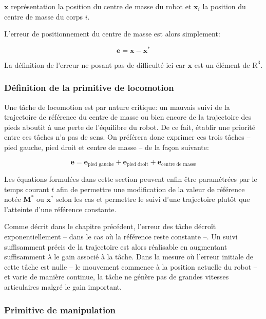 $\mathbf{x}$ représentation la position du centre de masse du robot et
$\mathbf{x}_i$ la position du centre de masse du corps $i$.

L'erreur de positionnement du centre de masse est alors simplement:

\begin{equation}
  \mathbf{e} = \mathbf{x} - \mathbf{x}^{*}
\end{equation}

La définition de l'erreur ne posant pas de difficulté ici car
$\mathbf{x}$ est un élément de $\mathrm{R}^3$.


\subsubsection{Définition de la primitive de locomotion}

Une tâche de locomotion est par nature critique: un mauvais suivi de
la trajectoire de référence du centre de masse ou bien encore de la
trajectoire des pieds aboutit à une perte de l'équilibre du robot. De
ce fait, établir une priorité entre ces tâches n'a pas de sens. On
préférera donc exprimer ces trois tâches -- pied gauche, pied droit et
centre de masse -- de la façon suivante:

\begin{equation}
  \mathbf{e} = \mathbf{e}_{\text{pied gauche}} + \mathbf{e}_{\text{pied droit}} + \mathbf{e}_{\text{centre de masse}}
\end{equation}

Les équations formulées dans cette section peuvent enfin être
paramétrées par le temps courant $t$ afin de permettre une
modification de la valeur de référence notée $\mathbf{M}^*$ ou
$\mathbf{x}^*$ selon les cas et permettre le suivi d'une trajectoire
plutôt que l'atteinte d'une référence constante.


Comme décrit dans le chapitre précédent, l'erreur des tâche décroît
exponentiellement -- dans le cas où la référence reste constante
--. Un suivi suffisamment précis de la trajectoire est alors
réalisable en augmentant suffisamment $\lambda$ le gain associé à la
tâche. Dans la mesure où l'erreur initiale de cette tâche est nulle --
le mouvement commence à la position actuelle du robot -- et varie de
manière continue, la tâche ne génère pas de grandes vitesses
articulaires malgré le gain important.


\subsubsection{Primitive de manipulation}


